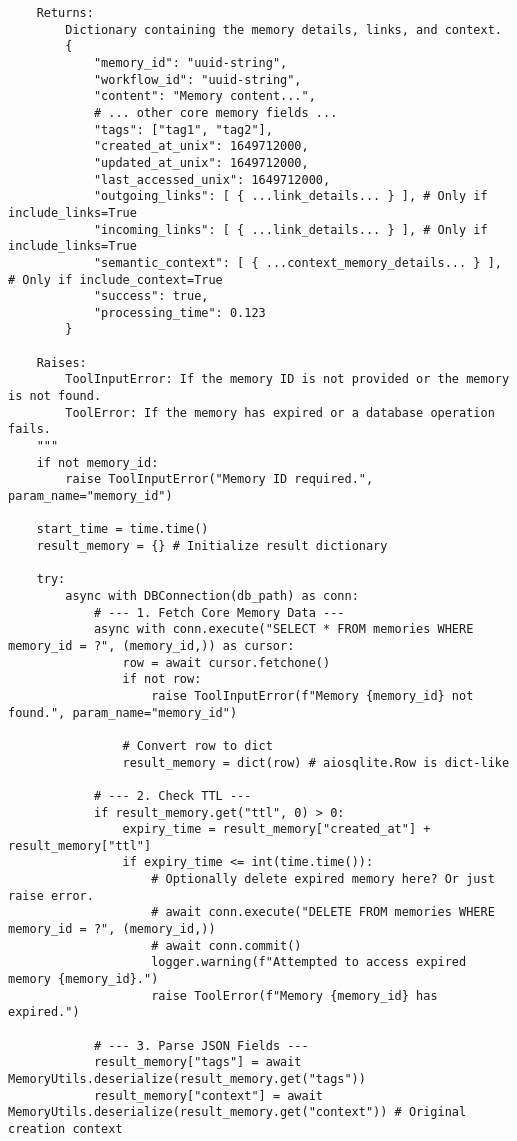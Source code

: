 \documentclass[12pt,a4paper]{article}
\begin{document}
\begin{pageablecode}
\begin{verbatim}
    Returns:
        Dictionary containing the memory details, links, and context.
        {
            "memory_id": "uuid-string",
            "workflow_id": "uuid-string",
            "content": "Memory content...",
            # ... other core memory fields ...
            "tags": ["tag1", "tag2"],
            "created_at_unix": 1649712000,
            "updated_at_unix": 1649712000,
            "last_accessed_unix": 1649712000,
            "outgoing_links": [ { ...link_details... } ], # Only if include_links=True
            "incoming_links": [ { ...link_details... } ], # Only if include_links=True
            "semantic_context": [ { ...context_memory_details... } ], # Only if include_context=True
            "success": true,
            "processing_time": 0.123
        }

    Raises:
        ToolInputError: If the memory ID is not provided or the memory is not found.
        ToolError: If the memory has expired or a database operation fails.
    """
    if not memory_id:
        raise ToolInputError("Memory ID required.", param_name="memory_id")

    start_time = time.time()
    result_memory = {} # Initialize result dictionary

    try:
        async with DBConnection(db_path) as conn:
            # --- 1. Fetch Core Memory Data ---
            async with conn.execute("SELECT * FROM memories WHERE memory_id = ?", (memory_id,)) as cursor:
                row = await cursor.fetchone()
                if not row:
                    raise ToolInputError(f"Memory {memory_id} not found.", param_name="memory_id")

                # Convert row to dict
                result_memory = dict(row) # aiosqlite.Row is dict-like

            # --- 2. Check TTL ---
            if result_memory.get("ttl", 0) > 0:
                expiry_time = result_memory["created_at"] + result_memory["ttl"]
                if expiry_time <= int(time.time()):
                    # Optionally delete expired memory here? Or just raise error.
                    # await conn.execute("DELETE FROM memories WHERE memory_id = ?", (memory_id,))
                    # await conn.commit()
                    logger.warning(f"Attempted to access expired memory {memory_id}.")
                    raise ToolError(f"Memory {memory_id} has expired.")

            # --- 3. Parse JSON Fields ---
            result_memory["tags"] = await MemoryUtils.deserialize(result_memory.get("tags"))
            result_memory["context"] = await MemoryUtils.deserialize(result_memory.get("context")) # Original creation context


\end{verbatim}
\end{pageablecode}
\end{document}
